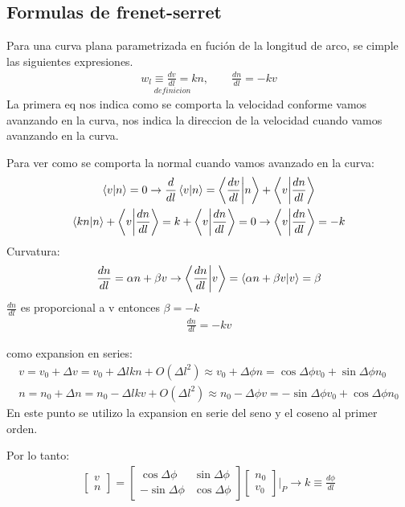 \documentclass{article}
\newcommand{\caja}[3]{%
  \begin{tcolorbox}[colback=#1!5!white,colframe=#1!25!black,title=#2]
    #3
  \end{tcolorbox}%
}
\begin{document}
\subsection{Formulas de frenet-serret}
\caja{red}{Frenet-Serret }{
  Para una curva plana parametrizada en fución de la longitud de arco, se cimple las siguientes expresiones. 
  \begin{gather}
    \underset{definicion}{w_l \equiv \frac{d v }{d l} = kn}, \qquad \frac{d n }{d l} = -kv    
    \label{eq:null}
  \end{gather}
  La primera eq nos indica como se comporta la velocidad conforme vamos avanzando en la curva, nos indica la direccion de la velocidad cuando vamos avanzando en la curva.
}
Para ver como se comporta la normal cuando vamos avanzado en la curva:
\begin{gather}
   \bra{v}\ket{n } = 0 \rightarrow \frac{d  }{d l }\bra{v }\ket{n} = \bra{\frac{d v }{d l}  }\ket{n }+\bra{v}\ket{\frac{d n  }{d l}  }\\
   \bra{kn}\ket{n }+\bra{v}\ket{\frac{d n }{d l}  } = k + \bra{v}\ket{\frac{d n }{d l}  } = 0 \rightarrow \bra{v}\ket{\frac{d n }{d l}  } = -k  
\end{gather}
Curvatura:
\begin{gather}
   \frac{d n }{d l} = \alpha n + \beta v \rightarrow \bra{\frac{d n }{d l}  }\ket{v} = \bra{\alpha n +\beta v }\ket{v} = \beta     
\end{gather}
$ \frac{d n }{d l}   $ es proporcional a v entonces $ \beta=-k $
\begin{gather}
   \frac{d n }{d l}=-kv  
\end{gather}

como expansion en series:
\begin{gather}
  v = v_0 + \Delta v = v_0 +\Delta l kn + O(\Delta l^2) \approx v_0 +\Delta \phi n = \cos{\Delta \phi } v_0 + \sin{\Delta\phi } n_0  \\
  n = n_0 + \Delta n = n_0 - \Delta lkv + O(\Delta l^2) \approx n_0-\Delta \phi v = -\sin{\Delta \phi } v_0 +\cos{\Delta\phi } n_0  
  \label{eq:expansion }
\end{gather}
En este punto se utilizo la expansion en serie del seno y el coseno al primer orden. 

Por lo tanto:
\begin{gather}
  \begin{bmatrix}
      v \\
      n 
  \end{bmatrix}  
  =
  \begin{bmatrix}
      \cos{\Delta\phi }   & \sin{\Delta \phi }   \\
      -\sin{\Delta \phi }   & \cos{\Delta \phi }  
  \end{bmatrix} 
  \begin{bmatrix}
      n_0  \\
      v_0  
  \end{bmatrix} |_P \rightarrow k \equiv \frac{d \phi  }{d l}   
  \label{eq:v_n}
\end{gather}
\end{document}

